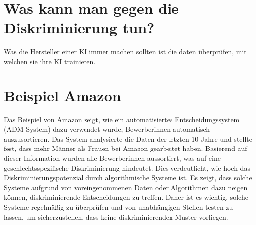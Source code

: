 \documentclass{article}
\begin{document}
\section{Was kann man gegen die Diskriminierung tun?}
Was die Hersteller einer KI immer machen sollten ist die daten überprüfen, mit welchen sie ihre KI trainieren.

\section{Beispiel Amazon}
Das Beispiel von Amazon zeigt, wie ein automatisiertes Entscheidungssystem (ADM-System) dazu verwendet wurde, Bewerberinnen automatisch auszusortieren. Das System analysierte die Daten der letzten 10 Jahre und stellte fest, dass mehr Männer als Frauen bei Amazon gearbeitet haben. Basierend auf dieser Information wurden alle Bewerberinnen aussortiert, was auf eine geschlechtsspezifische Diskriminierung hindeutet. Dies verdeutlicht, wie hoch das Diskriminierungspotenzial durch algorithmische Systeme ist. Es zeigt, dass solche Systeme aufgrund von voreingenommenen Daten oder Algorithmen dazu neigen können, diskriminierende Entscheidungen zu treffen. Daher ist es wichtig, solche Systeme regelmäßig zu überprüfen und von unabhängigen Stellen testen zu lassen, um sicherzustellen, dass keine diskriminierenden Muster vorliegen.

\printbibliography
\end{document}
